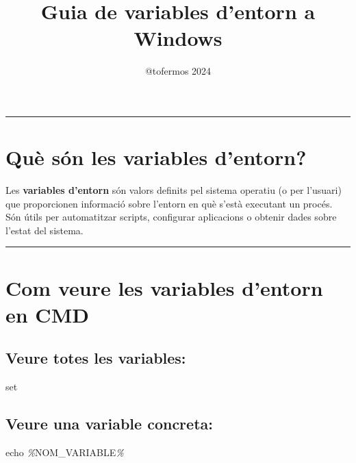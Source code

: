 \documentclass[
  a4paper,
]{article}
\title{Guia de variables d'entorn a Windows}
\author{@tofermos 2024}
\date{}
\newenvironment{Shaded}{\begin{snugshade}}{\end{snugshade}}
\newcommand{\BuiltInTok}[1]{#1}
\newcommand{\PreprocessorTok}[1]{\textcolor[rgb]{0.56,0.35,0.01}{\textit{#1}}}
\newcommand{\VariableTok}[1]{\textcolor[rgb]{0.00,0.00,0.00}{#1}}
\begin{document}
\maketitle

{
\setcounter{tocdepth}{2}
\tableofcontents
}
\newpage

\renewcommand\tablename{Tabla}

\begin{center}\rule{0.5\linewidth}{0.5pt}\end{center}

\section{Què són les variables
d'entorn?}\label{quuxe8-suxf3n-les-variables-dentorn}

Les \textbf{variables d'entorn} són valors definits pel sistema operatiu
(o per l'usuari) que proporcionen informació sobre l'entorn en què
s'està executant un procés. Són útils per automatitzar scripts,
configurar aplicacions o obtenir dades sobre l'estat del sistema.

\begin{center}\rule{0.5\linewidth}{0.5pt}\end{center}

\section{Com veure les variables d'entorn en
CMD}\label{com-veure-les-variables-dentorn-en-cmd}

\subsection{Veure totes les variables:}\label{veure-totes-les-variables}

\begin{Shaded}
\begin{Highlighting}[]
\BuiltInTok{set}
\end{Highlighting}
\end{Shaded}

\subsection{Veure una variable
concreta:}\label{veure-una-variable-concreta}

\begin{Shaded}
\begin{Highlighting}[]
\BuiltInTok{echo} \PreprocessorTok{\%}\VariableTok{NOM\_VARIABLE}\PreprocessorTok{\%}
\end{Highlighting}
\end{Shaded}
\end{document}
